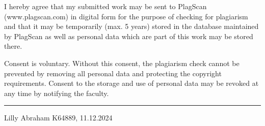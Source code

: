 \documentclass{report} %
\begin{document}
\noindent I hereby agree that my submitted work may be sent to PlagScan (www.plagscan.com) in digital form for the purpose of checking for plagiarism and that it may be temporarily (max. 5 years) stored in the database maintained by PlagScan as well as personal data which are part of this work may be stored there.

\vspace{0.5cm}

\noindent Consent is voluntary. Without this consent, the plagiarism check cannot be prevented by removing all personal data and protecting the copyright requirements. Consent to the storage and use of personal data may be revoked at any time by notifying the faculty.

\vspace{3cm}
\hfill\rule{15cm}{0.4pt} %

\begin{center}
    Lilly Abraham K64889, 11.12.2024 %
\end{center}
\end{document}
